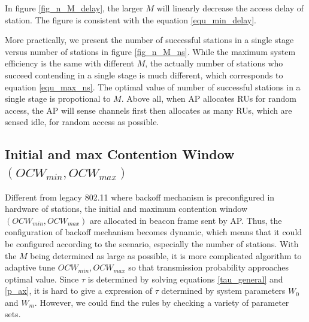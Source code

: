 \documentclass[journal]{IEEEtran}
\begin{document}
In figure \ref{fig_n_M_delay}, the larger $M$ will linearly decrease the access delay of station. The figure is consistent with the equation \ref{equ_min_delay}. 

More practically, we present the number of successful stations in a single stage versus number of stations in figure \ref{fig_n_M_ns}.
While the maximum system efficiency is the same with different $M$, the actually number of stations who succeed contending in a single stage is much different, which corresponds to equation \ref{equ_max_ns}. 
The optimal value of number of successful stations in a single stage is propotional to $M$. 
Above all, when AP allocates RUs for random access, the AP will sense channels first then allocates as many RUs, which are sensed idle, for random access as possible.



\subsection{Initial and max Contention Window $(OCW_{min}, OCW_{max})$}
\label{contend_window}
Different from legacy 802.11 where backoff mechanism is preconfigured in hardware of stations, the initial and maximum contention window $(OCW_{min}, OCW_{max})$ are allocated in beacon frame sent by AP. 
Thus, the configuration of backoff mechanism becomes dynamic, which means that it could be configured according to the scenario, especially the number of stations.
With the $M$ being determined as large as possible, it is more complicated algorithm to adaptive tune $OCW_{min}, OCW_{max}$ so that transmission probability approaches optimal value.
Since $\tau$ is determined by solving equations \ref{tau_general} and \ref{p_ax}, it is hard to give a expression of $\tau$ determined by system parameters $W_0$ and $W_m$.
However, we could find the rules by checking a variety of parameter sets.
\end{document}
